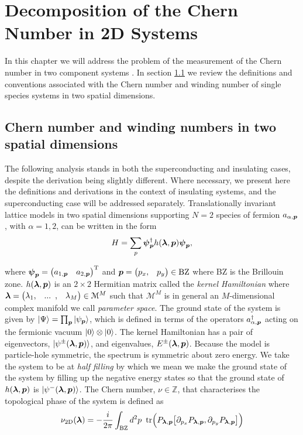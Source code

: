 \chapter{Decomposition of the Chern Number in 2D Systems}

\ifpdf
    \graphicspath{{Chapter2/Chapter2Figs/PNG/}{Chapter2/Chapter2/PDF/}{Chapter2/Chapter2Figs/}}
\else
    \graphicspath{{Chapter2/Chapter2Figs/EPS/}{Chapter2/Chapter2/}}
\fi

In this chapter we will address the problem of the measurement of the Chern number in two component systems \cite{delisle14}. In section \ref{sec:chernwind1species} we review the definitions and conventions associated with the Chern number and winding number of single species systems in two spatial dimensions. 

\section{Chern number and winding numbers in two spatial dimensions}\label{sec:chernwind1species}

The following analysis stands in both the superconducting and insulating cases, despite the derivation being slightly different. Where necessary, we present here the definitions and derivations in the context of insulating systems, and the superconducting case will be addressed separately. Translationally invariant lattice models in two spatial dimensions supporting $N=2$ species of fermion $a_{\alpha,\boldsymbol{p}}$, with $\alpha=1,2$, can be written in the form \cite{}
\begin{equation}\label{eqn:BDGHAM}
    H = \sum_{p} \boldsymbol{\psi}_{\boldsymbol{p}}^{\dagger}h(\boldsymbol{\lambda},\boldsymbol{p})\boldsymbol{\psi}_{\boldsymbol{p}},
\end{equation}

\noi where $\boldsymbol{\psi}_{\boldsymbol{p}}=\begin{pmatrix} a_{1,\boldsymbol{p}} & a_{2,\boldsymbol{p}} \end{pmatrix}^{\text{T}}$ and $\boldsymbol{p}=\begin{pmatrix} p_{x}, & p_{y}\end{pmatrix}\in\text{BZ}$ where BZ is the Brillouin zone. $h(\boldsymbol{\lambda},\boldsymbol{p})$ is an $2\times 2$ Hermitian matrix called the \emph{kernel Hamiltonian} where $\boldsymbol{\lambda}=\begin{pmatrix} \lambda_{1}, & ... \,\,\, , & \lambda_{M}\end{pmatrix}\in\mathcal{M}^{M}$ such that $\mathcal{M}^{M}$ is in general an $M$-dimensional complex manifold we call \emph{parameter space}. The ground state of the system is given by $\ket{\Psi}=\prod_{\boldsymbol{p}}\ket{\psi_{\boldsymbol{p}}}$, which is defined in terms of the operators $a^{\dagger}_{\alpha,\boldsymbol{p}}$ acting on the fermionic vacuum $\ket{0}\otimes\ket{0}$. The kernel Hamiltonian has a pair of eigenvectors, $\ket{\psi^{\pm}(\boldsymbol{\lambda},\boldsymbol{p})}$, and eigenvalues, $E^{\pm}(\boldsymbol{\lambda},\boldsymbol{p})$. Because the model is particle-hole symmetric, the spectrum is symmetric about zero energy. We take the system to be at \emph{half filling} by which we mean we make the ground state of the system by filling up the negative energy states so that the ground state of $h(\boldsymbol{\lambda},\boldsymbol{p})$ is $\ket{\psi^{-}(\boldsymbol{\lambda},\boldsymbol{p})}$. The Chern number, $\nu\in\mathbb{Z}$, that characterises the topological phase of the system is defined as
\begin{equation}\label{eqn:CHERNPROJ}
    \nu_{\text{2D}}(\boldsymbol{\lambda})=-\frac{i}{2\pi}\int_{\text{BZ}} d^{2}p \,\,\, \text{tr}\Big(P_{\boldsymbol{\lambda},\boldsymbol{p}}\big[\partial_{p_{x}}P_{\boldsymbol{\lambda},\boldsymbol{p}},\partial_{p_{y}}P_{\boldsymbol{\lambda},\boldsymbol{p}}\big]\Big)
\end{equation}

